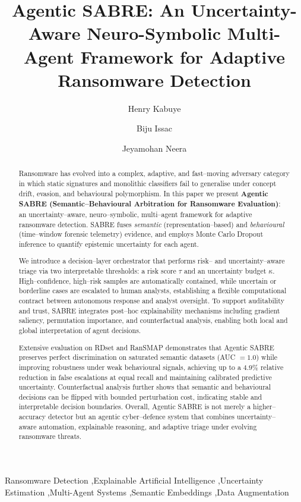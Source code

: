 \documentclass[3p]{elsarticle}
\begin{document}
\begin{frontmatter}

\title{Agentic SABRE: An Uncertainty-Aware Neuro-Symbolic Multi-Agent Framework for Adaptive Ransomware Detection}

\author[1]{Henry Kabuye}

\author[1]{Biju Issac}

\author[1]{Jeyamohan Neera}

\address[1]{Department of Computer and Information Sciences,
Northumbria University, Newcastle Upon Tyne, UK}


\begin{abstract}
\label{sec-abstract}
Ransomware has evolved into a complex, adaptive, and fast–moving adversary category in which static signatures and monolithic classifiers fail to generalise under concept drift, evasion, and behavioural polymorphism. In this paper we present \textbf{Agentic SABRE (Semantic–Behavioural Arbitration for Ransomware Evaluation)}: an uncertainty–aware, neuro–symbolic, multi–agent framework for adaptive ransomware detection. SABRE fuses \emph{semantic} (representation–based) and \emph{behavioural} (time–window forensic telemetry) evidence, and employs Monte Carlo Dropout inference to quantify epistemic uncertainty for each agent.

We introduce a decision–layer orchestrator that performs risk– and uncertainty–aware triage via two interpretable thresholds: a risk score $\tau$ and an uncertainty budget $\kappa$. High–confidence, high–risk samples are automatically contained, while uncertain or borderline cases are escalated to human analysts, establishing a flexible computational contract between autonomous response and analyst oversight. To support auditability and trust, SABRE integrates post–hoc explainability mechanisms including gradient saliency, permutation importance, and counterfactual analysis, enabling both local and global interpretation of agent decisions.

Extensive evaluation on RDset and RanSMAP demonstrates that Agentic SABRE preserves perfect discrimination on saturated semantic datasets (AUC $=1.0$) while improving robustness under weak behavioural signals, achieving up to a $4.9\%$ relative reduction in false escalations at equal recall and maintaining calibrated predictive uncertainty. Counterfactual analysis further shows that semantic and behavioural decisions can be flipped with bounded perturbation cost, indicating stable and interpretable decision boundaries. Overall, Agentic SABRE is not merely a higher–accuracy detector but an agentic cyber–defence system that combines uncertainty–aware automation, explainable reasoning, and adaptive triage under evolving ransomware threats.
\end{abstract}

\begin{keyword}
Ransomware Detection \sep Explainable Artificial Intelligence \sep Uncertainty Estimation \sep Multi-Agent Systems \sep Semantic Embeddings \sep Data Augmentation
\end{keyword}
\end{frontmatter}
\end{document}
